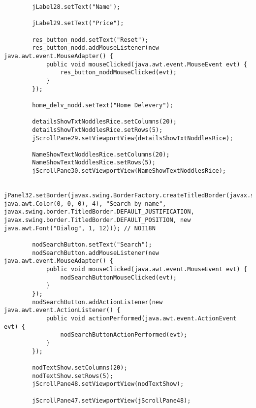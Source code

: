 \documentclass[12pt,a4paper]{article}
\begin{document}
\begin{lstlisting}
        jLabel28.setText("Name");

        jLabel29.setText("Price");

        res_button_nodd.setText("Reset");
        res_button_nodd.addMouseListener(new java.awt.event.MouseAdapter() {
            public void mouseClicked(java.awt.event.MouseEvent evt) {
                res_button_noddMouseClicked(evt);
            }
        });

        home_delv_nodd.setText("Home Delevery");

        detailsShowTxtNoddlesRice.setColumns(20);
        detailsShowTxtNoddlesRice.setRows(5);
        jScrollPane29.setViewportView(detailsShowTxtNoddlesRice);

        NameShowTextNoddlesRice.setColumns(20);
        NameShowTextNoddlesRice.setRows(5);
        jScrollPane30.setViewportView(NameShowTextNoddlesRice);

        jPanel32.setBorder(javax.swing.BorderFactory.createTitledBorder(javax.swing.BorderFactory.createLineBorder(new java.awt.Color(0, 0, 0), 4), "Search by name", javax.swing.border.TitledBorder.DEFAULT_JUSTIFICATION, javax.swing.border.TitledBorder.DEFAULT_POSITION, new java.awt.Font("Dialog", 1, 12))); // NOI18N

        nodSearchButton.setText("Search");
        nodSearchButton.addMouseListener(new java.awt.event.MouseAdapter() {
            public void mouseClicked(java.awt.event.MouseEvent evt) {
                nodSearchButtonMouseClicked(evt);
            }
        });
        nodSearchButton.addActionListener(new java.awt.event.ActionListener() {
            public void actionPerformed(java.awt.event.ActionEvent evt) {
                nodSearchButtonActionPerformed(evt);
            }
        });

        nodTextShow.setColumns(20);
        nodTextShow.setRows(5);
        jScrollPane48.setViewportView(nodTextShow);

        jScrollPane47.setViewportView(jScrollPane48);


\end{lstlisting}
\end{document}
